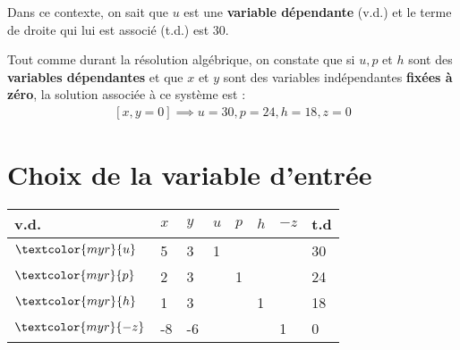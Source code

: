 \documentclass{report}
\begin{document}
\begin{multicols*}{2}
Dans ce contexte, on sait que $u$ est une \textbf{variable dépendante} (v.d.)  
et le terme de droite qui lui est associé (t.d.) est $30$. 



Tout comme durant la résolution algébrique, on constate que si $u, p$ et $h$ sont 
des \textbf{variables dépendantes} et que $x$ et $y$ sont des 
variables indépendantes \textbf{fixées à zéro}, la solution associée à ce système 
est : 
\begin{align*}
    \boxed{\left[ x, y = 0 \right] \implies u = 30, p = 24, h = 18, z = 0} 
\end{align*}

\section{Choix de la variable d'entrée}

        \begin{table}[H]
                \begin{center}
                    \renewcommand{\arraystretch}{1.5}
                    \selectfont
                    \footnotesize
                        \begin{tabular}{|l|l l l l l |l|l|}
                        \arrayrulecolor{blue}
                        \hline
                        v.d. & $x$
                             & $y$ & $u$ & $p$ & $h$ & $-z$ & t.d 
                        \\
                        \hline
                        \arrayrulecolor{black}
                        $\textcolor{myr}{u} 
                        $     & 5
                                & 3
                                & 1
                                & 
                                & &  &  30
                        \\
                        $\textcolor{myr}{p} $     
                               & 2
                               & 3
                               & & 1
                               & & & 24 
                        \\
                        $\textcolor{myr}{h} $     
                               & 1
                               & 3 
                               &  & 
                               &  1
                               & & 18 
                        \\ 
                        \hline
                        $\textcolor{myr}{-z}$ 
                               & \cellcolor{myb!40}-8
                                & -6
                                & 
                                & 
                                & 
                                & 1 & 0 
                        \\
                        \hline 




\end{tabular}
\end{center}
\end{table}
\end{multicols*}
\end{document}
